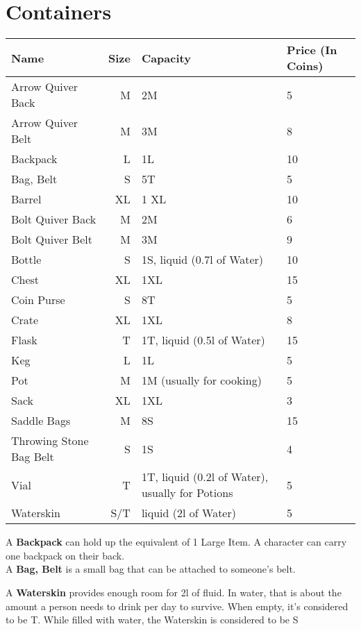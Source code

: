 \section{Containers}\label{sec:containers}
\begin{longtable}{l | r | p{4.5cm} | p{1.5cm}}
	Name & Size & Capacity & Price (In Coins)\\ \hline
	Arrow Quiver Back & M & 2M & 5 \\
	Arrow Quiver Belt & M & 3M & 8 \\
	Backpack & L & 1L & 10 \\
	Bag, Belt & S & 5T & 5 \\
	Barrel & XL & 1 XL & 10 \\
	Bolt Quiver Back & M & 2M & 6 \\
	Bolt Quiver Belt & M & 3M & 9 \\
	Bottle & S & 1S, liquid (0.7l of Water) & 10 \\
	Chest & XL & 1XL & 15 \\
	Coin Purse & S & 8T & 5 \\
	Crate & XL & 1XL & 8 \\
	Flask & T & 1T, liquid (0.5l of Water) & 15 \\
	Keg & L & 1L & 5 \\
	Pot & M & 1M (usually for cooking) & 5 \\
	Sack & XL & 1XL & 3 \\
	Saddle Bags & M & 8S & 15 \\
	Throwing Stone Bag Belt & S & 1S & 4 \\
	Vial & T & 1T, liquid (0.2l of Water), usually for Potions & 5 \\
	Waterskin & S/T & liquid (2l of Water) & 5 \\
\end{longtable}

A \textbf{Backpack} can hold up the equivalent of 1 Large Item.
A character can carry one backpack on their back.\\

A \textbf{Bag, Belt} is a small bag that can be attached to someone's belt.

A \textbf{Waterskin} provides enough room for 2l of fluid.
In water, that is about the amount a person needs to drink per day to survive.
When empty, it's considered to be T.
While filled with water, the Waterskin is considered to be S\\